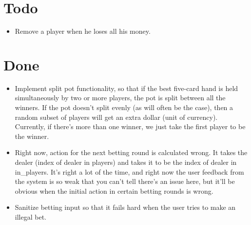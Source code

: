 \documentclass{article}
\begin{document}
\section*{Todo}
\begin{itemize}
\item Remove a player when he loses all his money.
\end{itemize}

\section*{Done}
\begin{itemize}
\item \CheckedBox Implement split pot functionality, so that if the best five-card
  hand is held simultaneously by two or more players, the pot is split
  between all the winners. If the pot doesn't split evenly (as will
  often be the case), then a random subset of players will get an
  extra dollar (unit of currency). Currently, if there's more than one
  winner, we just take the first player to be the winner.
\item \CheckedBox Right now, action for the next betting round is calculated
  wrong. It takes the dealer (index of dealer in players) and takes it
  to be the index of dealer in in\_players. It's right a lot of the
  time, and right now the user feedback from the system is so weak
  that you can't tell there's an issue here, but it'll be obvious when
  the initial action in certain betting rounds is wrong.
\item \CheckedBox Sanitize betting input so that it fails hard when the user tries
  to make an illegal bet.
\end{itemize}
\end{document}
